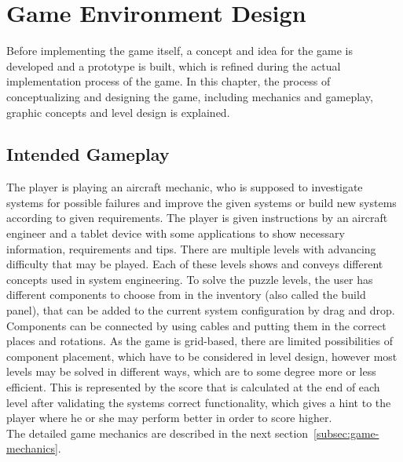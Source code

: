\section{Game Environment Design}\label{sec:game-environment-design}
Before implementing the game itself, a concept and idea for the game is developed and a prototype is built, which is refined during the
actual implementation process of the game.
In this chapter, the process of conceptualizing and designing the game, including mechanics and gameplay, graphic concepts and
level design is explained.

\subsection{Intended Gameplay}\label{subsec:intended-gameplay}
The player is playing an aircraft mechanic, who is supposed to investigate systems for possible failures and improve the given systems or
build new systems according to given requirements.
The player is given instructions by an aircraft engineer and a tablet device with some applications to show necessary
information, requirements and tips.
There are multiple levels with advancing difficulty that may be played.
Each of these levels shows and conveys different concepts used in system engineering.
To solve the puzzle levels, the user has different components to choose from in the inventory (also called the build panel), that
can be added to the current system configuration by drag and drop.
Components can be connected by using cables and putting them in the correct places and rotations.
As the game is grid-based, there are limited possibilities of component placement, which have to be considered in level design, however most levels
may be solved in different ways, which are to some degree more or less efficient.
This is represented by the score that is calculated at the end of each level after validating the systems correct functionality, which gives
a hint to the player where he or she may perform better in order to score higher.
\\
The detailed game mechanics are described in the next section~\ref{subsec:game-mechanics}.

